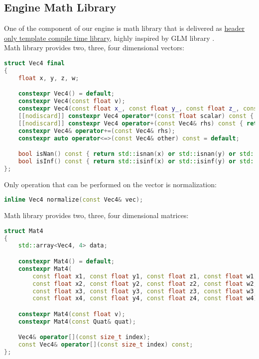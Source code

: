 \newpage

\subsection{Engine Math Library}
\label{sec:math}
One of the component of our engine is math library that is delivered as \hyperref[sec:build_struct]{header only template compile time library}, highly inspired by GLM library \cite{glm}.\\Math library provides two, three, four dimensional vectors:
\begin{lstlisting}[language=c++, caption=Vector class(./engine/include/tsengine/math.hpp)]
struct Vec4 final
{
    float x, y, z, w;

    constexpr Vec4() = default;
    constexpr Vec4(const float v);
    constexpr Vec4(const float x_, const float y_, const float z_, const float w_);
    [[nodiscard]] constexpr Vec4 operator*(const float scalar) const { return {x * scalar, y * scalar, z * scalar, w * scalar}; }
    [[nodiscard]] constexpr Vec4 operator+(const Vec4& rhs) const { return {x + rhs.x, y + rhs.y, z + rhs.z, w + rhs.w}; }
    constexpr Vec4& operator+=(const Vec4& rhs);
    constexpr auto operator<=>(const Vec4& other) const = default;

    bool isNan() const { return std::isnan(x) or std::isnan(y) or std::isnan(z) or std::isnan(w); }
    bool isInf() const { return std::isinf(x) or std::isinf(y) or std::isinf(z) or std::isinf(w); }
};
\end{lstlisting}
Only operation that can be performed on the vector is normalization:
\begin{lstlisting}[language=c++, caption=Vector operations(./engine/include/tsengine/math.hpp)]
inline Vec4 normalize(const Vec4& vec);
\end{lstlisting}
Math library provides two, three, four dimensional matrices:
\label{sec:mat}
\begin{lstlisting}[language=c++, caption=Matrix class(./engine/include/tsengine/math.hpp)]
struct Mat4
{
    std::array<Vec4, 4> data;

    constexpr Mat4() = default;
    constexpr Mat4(
        const float x1, const float y1, const float z1, const float w1,
        const float x2, const float y2, const float z2, const float w2,
        const float x3, const float y3, const float z3, const float w3,
        const float x4, const float y4, const float z4, const float w4);

    constexpr Mat4(const float v);
    constexpr Mat4(const Quat& quat);

    Vec4& operator[](const size_t index);
    const Vec4& operator[](const size_t index) const;
};
\end{lstlisting}
